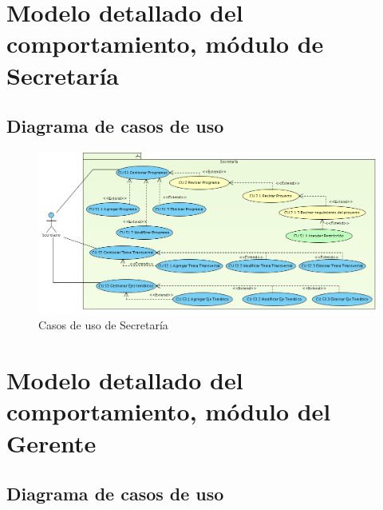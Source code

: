 \documentclass[10pt]{book}
\begin{document}

\chapter{Modelo detallado del comportamiento, módulo de Secretaría} 

\section{Diagrama de casos de uso}

\begin{figure}[htbp!]
	\begin{center}
		\includegraphics[width=\textwidth]{images/CUsecretaria}
		\caption{Casos de uso de Secretaría}
		\label{fig:default}
	\end{center}
\end{figure}




\chapter{Modelo detallado del comportamiento, módulo del Gerente} 
\section{Diagrama de casos de uso}
\end{document}
